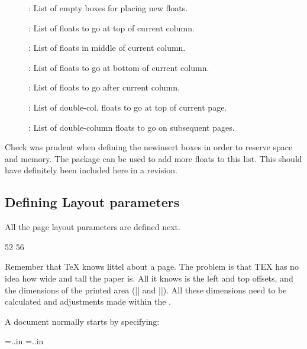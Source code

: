 \begin{description}
\item[\string\@freelist] : List of empty boxes for placing new 
floats.
\item[\string\@toplist] : List of 
floats to go at top of current column.
\item[\string\@midlist] : List of 
floats in middle of current column.
\item[\string\@botlist] : List of 
floats to go at bottom of current column.
\item[\string\@deferlist] : List of 
floats to go after current column.
\item[\string\@dbltoplist] : List of double-col. 
floats to go at top of current
page.
\item[\string\@dbldeferlist] : List of double-column 
floats to go on subsequent
pages.

\end{description}

\begin{multicols}{2}
Check was prudent when defining the newinsert boxes in order to reserve space and memory. The package  can be used to add more floats to this list. This should have definitely been included here in a revision.

\subsection{Defining Layout parameters} All the page layout parameters are defined next. 

\begin{teXXX}
52 \newdimen{} \newdimen{} \newdimen{} \let\@themargin=\oddsidemargin
56 \newdimen{} \newdimen{} \newdimen{} \newdimen{} \newdimen{} \newdimen{} \newdimen{} \newdimen{} \newdimen{} \newdimen{} \newdimen\marginparpush
\end{teXXX}

Remember  that TeX knows littel about a page. The problem is that TEX has no idea how
wide and tall the paper is. All it knows is the
left and top offsets, and the dimensions of the
printed area (|\hsize| and |\vsize|). All these dimensions need to be calculated and adjustments made within the \otr.

A document normally  starts by specifying:

\begin{teXXX}
\newdimen\paperheight
\newdimen\paperwidth
\paperheight=..in \paperwidth=..in
\end{teXXX}


\end{multicols}


